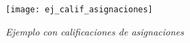 

\begin{figure}[H]
\centering
\texttt{[image: ej\_calif\_asignaciones]} %
\caption{\textit{Ejemplo con calificaciones de asignaciones}}
\end{figure}